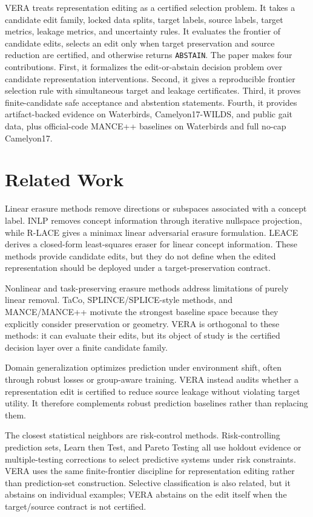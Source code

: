 \documentclass{article}
\begin{document}
VERA treats representation editing as a certified selection problem. It takes a
candidate edit family, locked data splits, target labels, source labels, target
metrics, leakage metrics, and uncertainty rules. It evaluates the frontier of
candidate edits, selects an edit only when target preservation and source
reduction are certified, and otherwise returns \texttt{ABSTAIN}. The paper
makes four contributions. First, it formalizes the edit-or-abstain decision
problem over candidate representation interventions. Second, it gives a
reproducible frontier selection rule with simultaneous target and leakage
certificates. Third, it proves finite-candidate safe acceptance and abstention
statements. Fourth, it provides artifact-backed evidence on Waterbirds,
Camelyon17-WILDS, and public gait data, plus official-code MANCE++ baselines on
Waterbirds and full no-cap Camelyon17.

\section{Related Work}

Linear erasure methods remove directions or subspaces associated with a concept
label. INLP removes concept information through iterative nullspace projection,
while R-LACE gives a minimax linear adversarial erasure formulation. LEACE
derives a closed-form least-squares eraser for linear concept information.
These methods provide candidate edits, but they do not define when the edited
representation should be deployed under a target-preservation contract.

Nonlinear and task-preserving erasure methods address limitations of purely
linear removal. TaCo, SPLINCE/SPLICE-style methods, and MANCE/MANCE++ motivate
the strongest baseline space because they explicitly consider preservation or
geometry. VERA is orthogonal to these methods: it can evaluate their edits, but
its object of study is the certified decision layer over a finite candidate
family.

Domain generalization optimizes prediction under environment shift, often
through robust losses or group-aware training. VERA instead audits whether a
representation edit is certified to reduce source leakage without violating
target utility. It therefore complements robust prediction baselines rather
than replacing them.

The closest statistical neighbors are risk-control methods. Risk-controlling
prediction sets, Learn then Test, and Pareto Testing all use holdout evidence
or multiple-testing corrections to select predictive systems under risk
constraints. VERA uses the same finite-frontier discipline for representation
editing rather than prediction-set construction. Selective classification is
also related, but it abstains on individual examples; VERA abstains on the edit
itself when the target/source contract is not certified.
\end{document}
